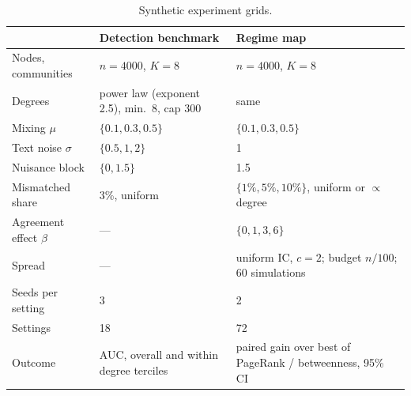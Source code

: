 \begin{table}[t]
\centering
\caption{Synthetic experiment grids.}
\label{tab:synthetic}
\small
\begin{tabularx}{\linewidth}{@{}l X X@{}}
\toprule
 & Detection benchmark & Regime map \\
\midrule
Nodes, communities & $n=4000$, $K=8$ & $n=4000$, $K=8$ \\
Degrees & power law (exponent 2.5), min.\ 8, cap 300 & same \\
Mixing $\mu$ & $\{0.1, 0.3, 0.5\}$ & $\{0.1, 0.3, 0.5\}$ \\
Text noise $\sigma$ & $\{0.5, 1, 2\}$ & 1 \\
Nuisance block & $\{0, 1.5\}$ & 1.5 \\
Mismatched share & 3\%, uniform & $\{1\%, 5\%, 10\%\}$, uniform or $\propto$ degree \\
Agreement effect $\beta$ & --- & $\{0, 1, 3, 6\}$ \\
Spread & --- & uniform IC, $c=2$; budget $n/100$; 60 simulations \\
Seeds per setting & 3 & 2 \\
Settings & 18 & 72 \\
Outcome & AUC, overall and within degree terciles & paired gain over best of PageRank / betweenness, 95\% CI \\
\bottomrule
\end{tabularx}
\end{table}
